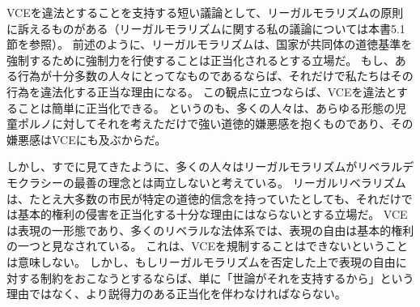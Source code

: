\documentclass[paper=a4,book,openany]{jlreq}
\begin{document}
VCEを違法とすることを支持する短い議論として、リーガルモラリズムの原則に訴えるものがある（リーガルモラリズムに関する私の議論については本書5.1節を参照）。
前述のように、リーガルモラリズムは、国家が共同体の道徳基準を強制するために強制力を行使することは正当化されるとする立場だ。
もし、ある行為が十分多数の人々にとってなものであるならば、それだけで私たちはその行為を違法化する正当な理由になる。
この観点に立つならば、VCEを違法とすることは簡単に正当化できる。
というのも、多くの人々は、あらゆる形態の児童ポルノに対してそれを考えただけで強い道徳的嫌悪感を抱くものであり、その嫌悪感はVCEにも及ぶからだ。

しかし、すでに見てきたように、多くの人々はリーガルモラリズムがリベラルデモクラシーの最善の理念とは両立しないと考えている。
リーガルリベラリズムは、たとえ大多数の市民が特定の道徳的信念を持っていたとしても、それだけでは基本的権利の侵害を正当化する十分な理由にはならないとする立場だ。
VCEは表現の一形態であり、多くのリベラルな法体系では、表現の自由は基本的権利の一つと見なされている。
これは、VCEを規制することはできないということは意味しない。
しかし、もしリーガルモラリズムを否定した上で表現の自由に対する制約をおこなうとするならば、単に「世論がそれを支持するから」という理由ではなく、より説得力のある正当化を伴わなければならない。
\end{document}
